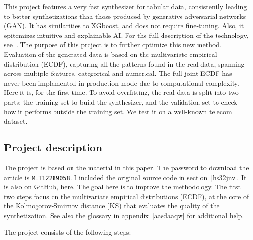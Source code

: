 \documentclass[oneside,10pt]{book}
\begin{document}
This project  features a very fast synthesizer for tabular data, consistently leading to better synthetizations 
than those produced by 
\textcolor{index}{generative adversarial networks} (GAN). It has similarities to \textcolor{index}{XGboost},
  and does not require fine-tuning. Also, it epitomizes intuitive and \textcolor{index}{explainable AI}.
For the full description of the technology, see~\cite{vgnogan}. The purpose of this project is to further optimize this
 new method.  Evaluation of the generated data
 is based on the \textcolor{index}{multivariate empirical distribution} (ECDF), capturing all the patterns found in the real data, spanning across multiple features, categorical and numerical. The
 full joint ECDF has never been implemented in production mode due to computational complexity. Here it is, for the
 first time. To avoid \textcolor{index}{overfitting}, the real data is split into two parts: the training set to build the synthesizer, and the \textcolor{index}{validation set} to check how it performs outside the training set. We test it on a well-known telecom dataset.

\subsection{Project description}

The project is based on the material \href{https://mltblog.com/3DBfjsi}{in this paper}. The password to download the article
 is \texttt{MLT12289058}. I included the original source code in section~\ref{hs32jnv}. It is also on GitHub,
 \href{https://github.com/VincentGranville/Main/blob/main/NoGAN.py}{here}. The goal here is to improve the methodology. The first two steps focus on the multivariate empirical distributions (ECDF), at the core of the \textcolor{index}{Kolmogorov-Smirnov distance} (KS) that evaluates the quality of the synthetization. See also the glossary
 in appendix~\ref{aasdaaqw} for additional help.

\noindent The project consists of the following steps: \vspace{1ex}
\end{document}
